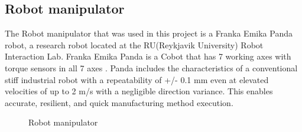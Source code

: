 \subsection{Robot manipulator\label{subsec:robot}}
The Robot manipulator that was used in this project is a Franka Emika Panda robot, a research robot located at the RU(Reykjavik University) Robot Interaction Lab. Franka Emika Panda is a Cobot that has 7 working axes with torque sensors in all 7 axes \cite{gmbh_franka_nodate}. Panda includes the characteristics of a conventional stiff industrial robot with a repeatability of +/- 0.1 mm even at elevated velocities of up to 2 m/s with a negligible direction variance. This enables accurate, resilient, and quick manufacturing method execution. 
\begin{figure}[h]
 \centering
 \hfill
 \caption{Robot manipulator}
 \label{figure: frankaemika}
\end{figure}

